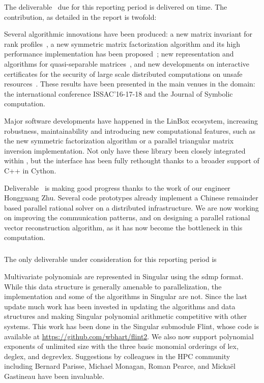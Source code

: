 The deliverable~ due for this reporting period is
delivered on time. The contribution, as detailed in the report is twofold:
\begin{compactitem}
\item Several algorithmic innovations have been produced: a new matrix invariant
  for rank profiles~\cite{DumPerSul:fcrpmgbd16}, a new symmetric matrix
  factorization algorithm and its high performance implementation has been
  proposed~\cite{DuPe18}; new representation and algorithms for quasi-separable
  matrices~\cite{Pernet:cqm16,PerSto:tsegqm17}, and new developments on 
  interactive certificates for the security of large scale distributed
  computations on unsafe
  resources~\cite{DumKalTho:lticmpdsm16,DumLucPer:cftearp17}. These results have been
  presented in the main venues in the domain:
  the international conference ISSAC'16-17-18 and the Journal of Symbolic computation.
\item Major software developments have happened in the LinBox ecosystem, increasing
  robustness, maintainability and introducing new computational features, such
  as the new symmetric factorization algorithm or a parallel triangular matrix
  inversion implementation. Not only have these library been closely integrated
  within \Sage, but the interface has been fully rethought thanks to a broader
  support of C++ in Cython.
\end{compactitem}


Deliverable~ is making good progress
  thanks to the work of our \ODK engineer Hongguang Zhu. Several code prototypes
  already implement a Chinese remainder based parallel rational solver on a distributed
  infrastructure. We are now working on improving the communication patterns,
  and on designing a parallel rational vector reconstruction algorithm, as it
  has now become the bottleneck in this computation.
  
  \subparagraph{}

  The only deliverable under consideration for this reporting period
  is~

Multivariate polynomials are represented in Singular using the sdmp format. While this data structure is generally amenable to parallelization, the implementation and some of the algorithms in Singular are not. Since the last update much work has been invested in updating the algorithms and data structures and making Singular polynomial arithmetic competitive with other systems. This work has been done in the Singular submodule Flint, whose code is available at \url{https://github.com/wbhart/flint2}. We also now support polynomial exponents of unlimited size with the three basic monomial orderings of lex, deglex, and degrevlex. Suggestions by colleagues in the HPC community including Bernard Parisse, Michael Monagan, Roman Pearce, and Micka\"el Gastineau have been invaluable.

